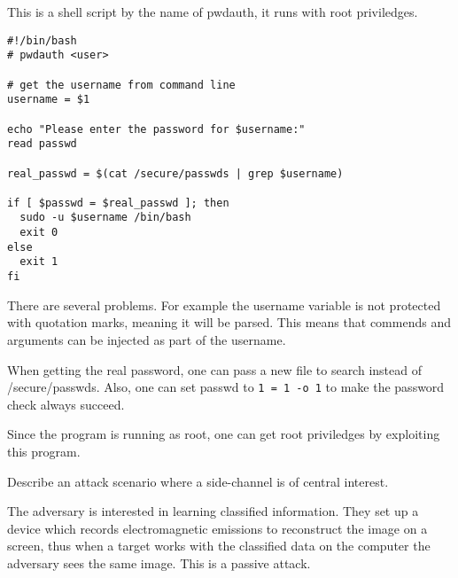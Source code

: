 This is a shell script by the name of pwdauth, it runs with root priviledges.
\begin{lstlisting}
#!/bin/bash
# pwdauth <user>

# get the username from command line
username = $1

echo "Please enter the password for $username:"
read passwd

real_passwd = $(cat /secure/passwds | grep $username)

if [ $passwd = $real_passwd ]; then
  sudo -u $username /bin/bash
  exit 0
else
  exit 1
fi
\end{lstlisting}

\begin{solution}
  There are several problems.
  For example the username variable is not protected with quotation marks, 
  meaning it will be parsed.
  This means that commends and arguments can be injected as part of the 
  username.

  When getting the real password, one can pass a new file to search instead of 
  /secure/passwds.
  Also, one can set passwd to \verb'1 = 1 -o 1' to make the password check 
  always succeed.

  Since the program is running as root, one can get root priviledges by 
  exploiting this program.
\end{solution}

\question[2]\label{q:sidechannels}
Describe an attack scenario where a side-channel is of central interest.

\begin{solution}
  The adversary is interested in learning classified information.
  They set up a device which records electromagnetic emissions to reconstruct 
  the image on a screen, thus when a target works with the classified data on 
  the computer the adversary sees the same image.
  This is a passive attack.
\end{solution}


